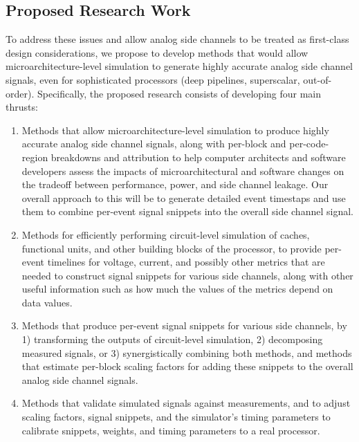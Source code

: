 \documentclass[11 pt]{article}
\begin{document}
\subsection{Proposed Research Work}
To address these issues and allow analog side channels to be treated as first-class design considerations, we propose to develop methods that would allow microarchitecture-level simulation to generate highly accurate analog side channel signals, even for sophisticated processors (deep pipelines, superscalar, out-of-order). Specifically, the proposed research consists of developing four main thrusts:

\begin{enumerate}
\item Methods that allow microarchitecture-level simulation to produce highly accurate analog side channel signals, along with per-block and per-code-region breakdowns and attribution to help computer architects and software developers assess the impacts of microarchitectural and software changes on the tradeoff between performance, power, and side channel leakage. Our overall approach to this will be to generate detailed event timestaps and use them to combine per-event signal snippets into the overall side channel signal.
\item Methods for efficiently performing circuit-level simulation of caches, functional units, and other building blocks of the processor, to provide per-event timelines for voltage, current, and possibly other metrics that are needed to construct signal snippets for various side channels, along with other useful information such as how much the values of the metrics depend on data values.
\item Methods that produce per-event signal snippets for various side channels, by 1) transforming the outputs of circuit-level simulation, 2) decomposing measured signals, or 3) synergistically combining both methods, and methods that estimate per-block scaling factors for adding these snippets to the overall analog side channel signals.
\item Methods that validate simulated signals against measurements, and to adjust scaling factors, signal snippets, and the simulator's timing parameters to calibrate snippets, weights, and timing parameters to a real processor.
\end{enumerate}

\end{document}
